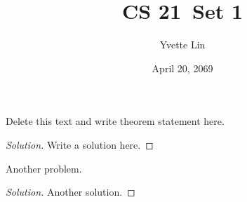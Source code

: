 \documentclass[12pt]{article}
\newcommand{\class}{CS 21}
\newcommand{\set}{Set 1}
\newcommand{\student}{Yvette Lin}
\newcommand{\duedate}{April 20, 2069}
\newenvironment{problem}[2][Problem]{\begin{trivlist} \item[\hskip \labelsep {\bfseries #1}\hskip \labelsep {\bfseries #2.}]}{\end{trivlist}}
\begin{document}
 
\title{\class \ \set}
\author{\student}
\date{\duedate}
\maketitle
\thispagestyle{titlepagestyle}
 
\begin{problem}{1.1}
    Delete this text and write theorem statement here.
\end{problem}

\begin{proof}[Solution]
    Write a solution here.
\end{proof}

\pagebreak

\begin{problem}{1.2}
    Another problem.
\end{problem}

\begin{proof}[Solution]
    Another solution.
\end{proof}
\end{document}

